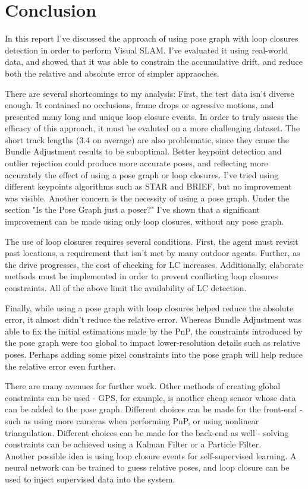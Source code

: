 \documentclass[12pt]{article}
\begin{document}
\section{Conclusion}
In this report I've discussed the approach of using pose graph with loop closures detection in order to perform Visual SLAM. I've evaluated it using real-world data, and showed that it was able to constrain the accumulative drift, and reduce both the relative and absolute error of simpler appraoches. 

There are several shortcomings to my analysis:
  First, the test data isn't diverse enough. It contained no occlusions, frame drops or agressive motions, and presented many long and unique loop closure events. In order to truly assess the efficacy of this approach, it must be evaluted on a more challenging dataset.
  The short track lengths (3.4 on average) are also problematic, since they cause the Bundle Adjustment results to be suboptimal. Better keypoint detection and outlier rejection could produce more accurate poses, and reflecting more accurately the effect of using a pose graph or loop closures. I've tried using different keypoints algorithms such as STAR and BRIEF, but no improvement was visible. 
  Another concern is the necessity of using a pose graph. Under the section "Is the Pose Graph just a poser?" I've shown that a significant improvement can be made using only loop closures, without any pose graph.

The use of loop closures requires several conditions. First, the agent must revisit past locations, a requirement that isn't met by many outdoor agents. Further, as the drive progresses, the cost of checking for LC increases. Additionally, elaborate methods must be implemented in order to prevent conflicting loop closures constraints. All of the above limit the availability of LC detection. 

Finally, while using a pose graph with loop closures helped reduce the absolute error, it almost didn't reduce the relative error. Whereas Bundle Adjustment was able to fix the initial estimations made by the PnP, the constraints introduced by the pose graph were too global to impact lower-resolution details such as relative poses. Perhaps adding some pixel constraints into the pose graph will help reduce the relative error even further.  

There are many avenues for further work. Other methods of creating global constraints can be used - GPS, for example, is another cheap sensor whose data can be added to the pose graph. Different choices can be made for the front-end - such as using more cameras when performing PnP, or using nonlinear triangulation. Different choices can be made for the back-end as well - solving constraints can be achieved using a Kalman Filter or a Particle Filter. \\ Another possible idea is using loop closure events for self-supervised learning. A neural network can be trained to guess relative poses, and loop closure can be used to inject supervised data into the system.
\end{document}
